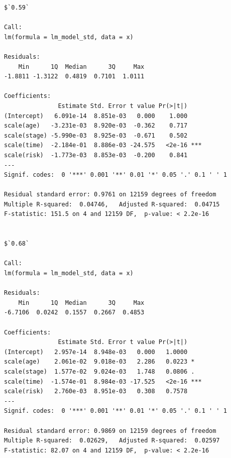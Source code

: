 \documentclass[]{revtex4}\usepackage[]{graphicx}\usepackage[]{color}
\makeatletter
\newenvironment{kframe}{%
 \def\at@end@of@kframe{}%
 \ifinner\ifhmode%
  \def\at@end@of@kframe{\end{minipage}}%
  \begin{minipage}{\columnwidth}%
 \fi\fi%
 \def\FrameCommand##1{\hskip\@totalleftmargin \hskip-\fboxsep
 \colorbox{shadecolor}{##1}\hskip-\fboxsep
     \hskip-\linewidth \hskip-\@totalleftmargin \hskip\columnwidth}%
 \MakeFramed {\advance\hsize-\width
   \@totalleftmargin\z@ \linewidth\hsize
   \@setminipage}}%
 {\par\unskip\endMakeFramed%
 \at@end@of@kframe}
\newenvironment{knitrout}{}{} %
\makeatother
\begin{document}
\begin{knitrout}
\begin{kframe}
\begin{verbatim}
$`0.59`

Call:
lm(formula = lm_model_std, data = x)

Residuals:
    Min      1Q  Median      3Q     Max 
-1.8811 -1.3122  0.4819  0.7101  1.0111 

Coefficients:
               Estimate Std. Error t value Pr(>|t|)    
(Intercept)   6.091e-14  8.851e-03   0.000    1.000    
scale(age)   -3.231e-03  8.920e-03  -0.362    0.717    
scale(stage) -5.990e-03  8.925e-03  -0.671    0.502    
scale(time)  -2.184e-01  8.886e-03 -24.575   <2e-16 ***
scale(risk)  -1.773e-03  8.853e-03  -0.200    0.841    
---
Signif. codes:  0 '***' 0.001 '**' 0.01 '*' 0.05 '.' 0.1 ' ' 1

Residual standard error: 0.9761 on 12159 degrees of freedom
Multiple R-squared:  0.04746,	Adjusted R-squared:  0.04715 
F-statistic: 151.5 on 4 and 12159 DF,  p-value: < 2.2e-16


$`0.68`

Call:
lm(formula = lm_model_std, data = x)

Residuals:
    Min      1Q  Median      3Q     Max 
-6.7106  0.0242  0.1557  0.2667  0.4853 

Coefficients:
               Estimate Std. Error t value Pr(>|t|)    
(Intercept)   2.957e-14  8.948e-03   0.000   1.0000    
scale(age)    2.061e-02  9.018e-03   2.286   0.0223 *  
scale(stage)  1.577e-02  9.024e-03   1.748   0.0806 .  
scale(time)  -1.574e-01  8.984e-03 -17.525   <2e-16 ***
scale(risk)   2.760e-03  8.951e-03   0.308   0.7578    
---
Signif. codes:  0 '***' 0.001 '**' 0.01 '*' 0.05 '.' 0.1 ' ' 1

Residual standard error: 0.9869 on 12159 degrees of freedom
Multiple R-squared:  0.02629,	Adjusted R-squared:  0.02597 
F-statistic: 82.07 on 4 and 12159 DF,  p-value: < 2.2e-16
\end{verbatim}
\end{kframe}
\end{knitrout}
\end{document}
